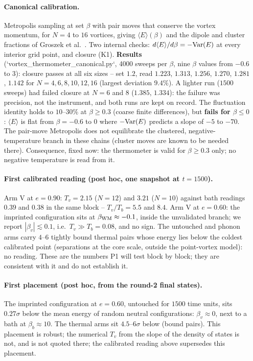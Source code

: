 \documentclass[11pt,a4paper]{article}
\begin{document}
\paragraph{Canonical calibration.} Metropolis sampling at set $\beta$ with pair moves that conserve the
vortex momentum, for $N=4$ to $16$ vortices, giving $\langle E\rangle(\beta)$ and the dipole and cluster
fractions of Groszek et al.~\cite{Groszek2018}. Two internal checks: $d\langle E\rangle/d\beta=-{\rm Var}(E)$
at every interior grid point, and closure (K1). \textbf{Results} (`vortex\_thermometer\_canonical.py`, 4000 sweeps per
$\beta$, nine $\beta$ values from $-0.6$ to $3$): closure passes at all six sizes -- set $1.2$, read $1.223$, $1.313$,
$1.256$, $1.270$, $1.281$, $1.142$ for $N=4,6,8,10,12,16$ (largest deviation $9.4\%$). A lighter run ($1500$
sweeps) had failed closure at $N=6$ and $8$ ($1.385$, $1.334$): the failure was precision, not the instrument, and
both runs are kept on record. The fluctuation identity holds to $10$--$30\%$ at $\beta\ge0.3$ (coarse finite
differences), but \textbf{fails for $\beta\le0$}: $\langle E\rangle$ is flat from $\beta=-0.6$ to $0$ where
$-{\rm Var}(E)$ predicts a slope of $-5$ to $-70$. The pair-move Metropolis does not equilibrate the clustered,
negative-temperature branch in these chains (cluster moves are known to be needed there). Consequence, fixed now:
the thermometer is valid for $\beta\ge0.3$ only; no negative temperature is read from it.

\paragraph{First calibrated reading (post hoc, one snapshot at $t=1500$).} Arm V at $e=0.90$: $T_v=2.15$ ($N=12$)
and $3.21$ ($N=10$) against bath readings $0.39$ and $0.38$ in the same block -- $T_v/T_b=5.5$ and $8.4$. Arm V at
$e=0.60$: the imprinted configuration sits at $\beta_{\rm WM}\approx-0.1$, inside the unvalidated branch; we report
$|\beta_v|\lesssim0.1$, i.e.\ $T_v\gg T_b=0.08$, and no sign. The untouched and phonon arms carry $4$--$6$ tightly
bound thermal pairs whose energy lies below the coldest calibrated point (separations at the core scale, outside the
point-vortex model): no reading. These are the numbers P1 will test block by block; they are consistent with it and
do not establish it.

\paragraph{First placement (post hoc, from the round-2 final states).} The imprinted configuration at
$e=0.60$, untouched for $1500$ time units, sits $0.27\sigma$ below the mean energy of random neutral
configurations: $\beta_v\approx0$, next to a bath at $\beta_b\approx10$. The thermal arms sit $4.5$--$6\sigma$
below (bound pairs). This placement is robust; the numerical $T_v$ from the slope of the density of states
is not, and is not quoted there; the calibrated reading above supersedes this placement.
\end{document}
